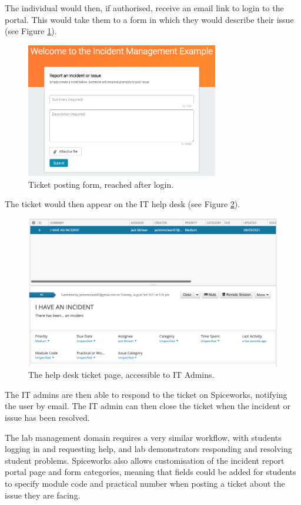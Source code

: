 The individual would then, if authorised, receive an email link to login to the portal. This would take them to a form in which they would describe their issue (see Figure \ref{fig:spiceform}).

\FloatBarrier
\begin{figure}[H]
  \centering
  \includegraphics[width=0.75\textwidth]{2context/images/SWpostTicket.png}
  \caption{Ticket posting form, reached after login.}
  \label{fig:spiceform}
\end{figure}

The ticket would then appear on the IT help desk (see Figure \ref{fig:spicedesk}).

\FloatBarrier
\begin{figure}[H]
  \centering
  \includegraphics[width=\textwidth]{2context/images/SWticketPage.png}
  \caption{The help desk ticket page, accessible to IT Admins.}
  \label{fig:spicedesk}
\end{figure}

The IT admins are then able to respond to the ticket on Spiceworks, notifying the user by email. The IT admin can then close the ticket when the incident or issue has been resolved.

The lab management domain requires a very similar workflow, with students logging in and requesting help, and lab demonstrators responding and resolving student problems. Spiceworks also allows customisation of the incident report portal page and form categories, meaning that fields could be added for students to specify module code and practical number when posting a ticket about the issue they are facing.

